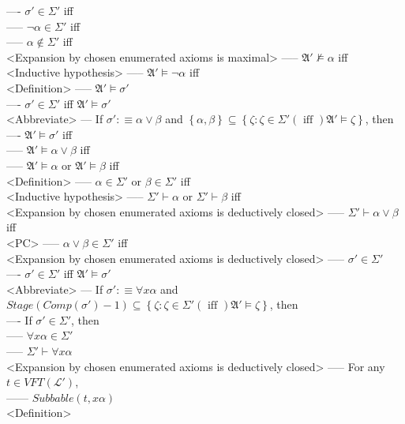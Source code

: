 \documentclass{book}
\newcommand{\is}{:\equiv}
\newcommand{\inot}{\not}
\newcommand{\txtiff}{\left(\text{ iff }\right)}
\newcommand{\set}[1]{\left\{ #1 \right\}}
\begin{document}
				---- $\sigma' \in \Sigma'$ iff \\
					----- $\lnot \alpha \in \Sigma'$ iff \\
					----- $\alpha \inot \in \Sigma'$ iff \\ <Expansion by chosen enumerated axioms is maximal>
					----- $\mathfrak{A}' \inot \vDash \alpha$ iff \\ <Inductive hypothesis>
					----- $\mathfrak{A}' \vDash \lnot \alpha$ iff \\ <Definition>
					----- $\mathfrak{A}' \vDash \sigma'$	\\
				---- $\sigma' \in \Sigma'$ iff $\mathfrak{A}' \vDash \sigma'$ \\ <Abbreviate>
			--- If $\sigma' \is \alpha \lor \beta$ and $\set{\alpha, \beta} \subseteq \set{\zeta: \zeta \in \Sigma' \txtiff \mathfrak{A}' \vDash \zeta}$, then \\
				---- $\mathfrak{A}' \vDash \sigma'$ iff \\
					----- $\mathfrak{A}' \vDash \alpha \lor \beta$ iff \\
					----- $\mathfrak{A}' \vDash \alpha$ or $\mathfrak{A}' \vDash \beta$ iff \\ <Definition>
					----- $\alpha \in \Sigma'$ or $\beta \in \Sigma'$ iff \\ <Inductive hypothesis>
					----- $\Sigma' \vdash \alpha$ or $\Sigma' \vdash \beta$ iff \\ <Expansion by chosen enumerated axioms is deductively closed>
					----- $\Sigma' \vdash \alpha \lor \beta$ iff \\ <PC>
					----- $\alpha \lor \beta \in \Sigma'$ iff \\ <Expansion by chosen enumerated axioms is deductively closed>
					----- $\sigma' \in \Sigma'$ \\
				---- $\sigma' \in \Sigma'$ iff $\mathfrak{A}' \vDash \sigma'$ \\ <Abbreviate>
			--- If $\sigma' \is \forall x \alpha$ and $Stage(Comp(\sigma') - 1) \subseteq \set{\zeta: \zeta \in \Sigma' \txtiff \mathfrak{A}' \vDash \zeta}$, then \\
				---- If $\sigma' \in \Sigma'$, then \\
					----- $\forall x \alpha \in \Sigma'$ \\
					----- $\Sigma' \vdash \forall x \alpha$ \\ <Expansion by chosen enumerated axioms is deductively closed>
					----- For any $t \in VFT(\mathcal{L}')$, \\
						------ $Subbable(t, x \alpha)$ \\ <Definition>
\end{document}
